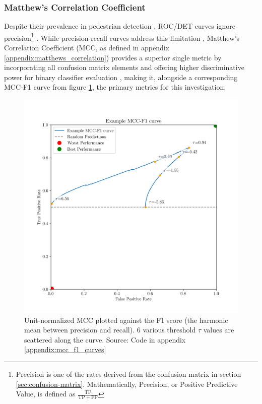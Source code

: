 \subsubsection{Matthew's Correlation Coefficient}

Despite their prevalence in pedestrian detection \cite{dalal_2005_histograms} \cite{dollar_2012_pedestrian} \cite{dollar_2009_pedestrian}, ROC/DET curves ignore precision\footnote{Precision is one of the rates derived from the confusion matrix in section \ref{sec:confusion-matrix}. Mathematically, Precision, or Positive Predictive Value, is defined as $\frac{\mathrm{TP}}{\mathrm{TP}+\mathrm{FP}}$} \cite{chicco_eval_2023} \cite{chicco_jurman_2020_mcc_f1}. While precision-recall curves address this limitation \cite{chicco_jurman_2020_mcc_f1}, Matthew's Correlation Coefficient (MCC, as defined in appendix \ref{appendix:matthews_correlation}) provides a superior single metric by incorporating all confusion matrix elements and offering higher discriminative power for binary classifier evaluation \cite{Maier_Hein_2024_mcc_proposal} \cite{chicco_eval_2023}, making it, alongside a corresponding MCC-F1 curve from figure \ref{fig:mcc_f1_example}, the primary metrics for this investigation.
\begin{figure}
    \centering
    \includegraphics[width=0.75\linewidth]{images/mcc_f1_example.png}
    \caption{Unit-normalized MCC plotted against the F1 score (the harmonic mean between precision and recall). 6 various threshold $\tau$ values are scattered along the curve. Source: Code in appendix \ref{appendix:mcc_f1_curves}}
    \label{fig:mcc_f1_example}
\end{figure}

